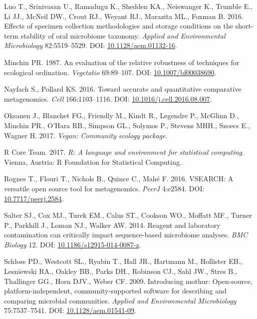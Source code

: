 \documentclass[12pt,]{article}
\begin{document}
\hypertarget{ref-preservation_Luo_2016}{}
Luo T., Srinivasan U., Ramadugu K., Shedden KA., Neiswanger K., Trumble
E., Li JJ., McNeil DW., Crout RJ., Weyant RJ., Marazita ML., Foxman B.
2016. Effects of specimen collection methodologies and storage
conditions on the short-term stability of oral microbiome taxonomy.
\emph{Applied and Environmental Microbiology} 82:5519--5529. DOI:
\href{https://doi.org/10.1128/aem.01132-16}{10.1128/aem.01132-16}.

\hypertarget{ref-bc_index_Minchin1987}{}
Minchin PR. 1987. An evaluation of the relative robustness of techniques
for ecological ordination. \emph{Vegetatio} 69:89--107. DOI:
\href{https://doi.org/10.1007/bf00038690}{10.1007/bf00038690}.

\hypertarget{ref-metagenomcis_bias_Nayfach_2016}{}
Nayfach S., Pollard KS. 2016. Toward accurate and quantitative
comparative metagenomics. \emph{Cell} 166:1103--1116. DOI:
\href{https://doi.org/10.1016/j.cell.2016.08.007}{10.1016/j.cell.2016.08.007}.

\hypertarget{ref-vegan_citation}{}
Oksanen J., Blanchet FG., Friendly M., Kindt R., Legendre P., McGlinn
D., Minchin PR., O'Hara RB., Simpson GL., Solymos P., Stevens MHH.,
Szoecs E., Wagner H. 2017. \emph{Vegan: Community ecology package}.

\hypertarget{ref-r_citation_2017}{}
R Core Team. 2017. \emph{R: A language and environment for statistical
computing}. Vienna, Austria: R Foundation for Statistical Computing.

\hypertarget{ref-vsearch_Rognes_2016}{}
Rognes T., Flouri T., Nichols B., Quince C., Mahé F. 2016. VSEARCH: A
versatile open source tool for metagenomics. \emph{PeerJ} 4:e2584. DOI:
\href{https://doi.org/10.7717/peerj.2584}{10.7717/peerj.2584}.

\hypertarget{ref-contamination_Salter2014}{}
Salter SJ., Cox MJ., Turek EM., Calus ST., Cookson WO., Moffatt MF.,
Turner P., Parkhill J., Loman NJ., Walker AW. 2014. Reagent and
laboratory contamination can critically impact sequence-based microbiome
analyses. \emph{BMC Biology} 12. DOI:
\href{https://doi.org/10.1186/s12915-014-0087-z}{10.1186/s12915-014-0087-z}.

\hypertarget{ref-mothur_schloss_2009}{}
Schloss PD., Westcott SL., Ryabin T., Hall JR., Hartmann M., Hollister
EB., Lesniewski RA., Oakley BB., Parks DH., Robinson CJ., Sahl JW.,
Stres B., Thallinger GG., Horn DJV., Weber CF. 2009. Introducing mothur:
Open-source, platform-independent, community-supported software for
describing and comparing microbial communities. \emph{Applied and
Environmental Microbiology} 75:7537--7541. DOI:
\href{https://doi.org/10.1128/aem.01541-09}{10.1128/aem.01541-09}.
\end{document}
